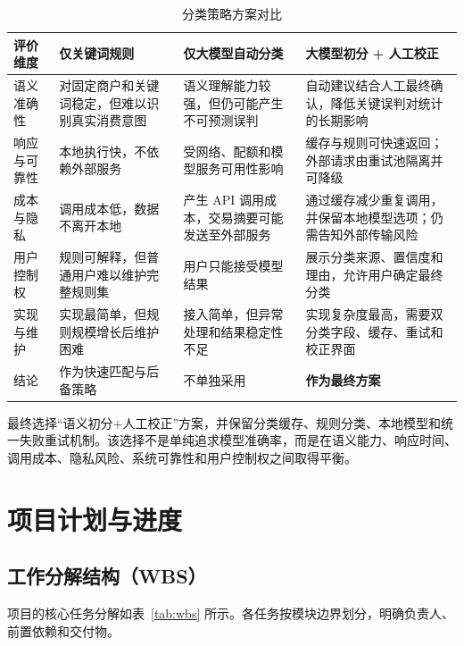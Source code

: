 \begin{table}[H]
\centering
\small
\caption{分类策略方案对比}
\label{tab:alternatives}
\begin{tabularx}{0.98\textwidth}{p{2.1cm} X X X}
\toprule
\textbf{评价维度} & \textbf{仅关键词规则} & \textbf{仅大模型自动分类} & \textbf{大模型初分 + 人工校正} \\
\midrule
语义准确性 & 对固定商户和关键词稳定，但难以识别真实消费意图 & 语义理解能力较强，但仍可能产生不可预测误判 & 自动建议结合人工最终确认，降低关键误判对统计的长期影响 \\
\hline
响应与可靠性 & 本地执行快，不依赖外部服务 & 受网络、配额和模型服务可用性影响 & 缓存与规则可快速返回；外部请求由重试池隔离并可降级 \\
\hline
成本与隐私 & 调用成本低，数据不离开本地 & 产生 API 调用成本，交易摘要可能发送至外部服务 & 通过缓存减少重复调用，并保留本地模型选项；仍需告知外部传输风险 \\
\hline
用户控制权 & 规则可解释，但普通用户难以维护完整规则集 & 用户只能接受模型结果 & 展示分类来源、置信度和理由，允许用户确定最终分类 \\
\hline
实现与维护 & 实现最简单，但规则规模增长后维护困难 & 接入简单，但异常处理和结果稳定性不足 & 实现复杂度最高，需要双分类字段、缓存、重试和校正界面 \\
\hline
结论 & 作为快速匹配与后备策略 & 不单独采用 & \textbf{作为最终方案} \\
\bottomrule
\end{tabularx}
\end{table}

最终选择“语义初分+人工校正”方案，并保留分类缓存、规则分类、本地模型和统一失败重试机制。该选择不是单纯追求模型准确率，而是在语义能力、响应时间、调用成本、隐私风险、系统可靠性和用户控制权之间取得平衡。

\section{项目计划与进度}

\subsection{工作分解结构（WBS）}

项目的核心任务分解如表~\ref{tab:wbs} 所示。各任务按模块边界划分，明确负责人、前置依赖和交付物。

